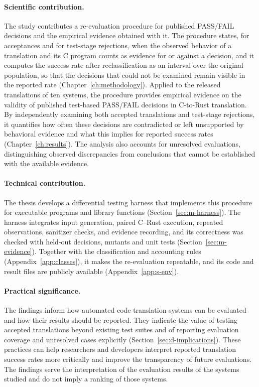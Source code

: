 \paragraph{Scientific contribution.} The study contributes a re-evaluation procedure for published PASS/FAIL decisions and the empirical evidence obtained with it. The procedure states, for acceptances and for test-stage rejections, when the observed behavior of a translation and its C program counts as evidence for or against a decision, and it computes the success rate after reclassification as an interval over the original population, so that the decisions that could not be examined remain visible in the reported rate (Chapter~\ref{ch:methodology}). Applied to the released translations of ten systems, the procedure provides empirical evidence on the validity of published test-based PASS/FAIL decisions in C-to-Rust translation. By independently examining both accepted translations and test-stage rejections, it quantifies how often these decisions are contradicted or left unsupported by behavioral evidence and what this implies for reported success rates (Chapter~\ref{ch:results}). The analysis also accounts for unresolved evaluations, distinguishing observed discrepancies from conclusions that cannot be established with the available evidence.

\paragraph{Technical contribution.} The thesis develops a differential testing harness that implements this procedure for executable programs and library functions (Section~\ref{sec:m-harness}). The harness integrates input generation, paired C--Rust execution, repeated observations, sanitizer checks, and evidence recording, and its correctness was checked with held-out decisions, mutants and unit tests (Section~\ref{sec:m-evidence}). Together with the classification and accounting rules (Appendix~\ref{app:classes}), it makes the re-evaluation repeatable, and its code and result files are publicly available (Appendix~\ref{app:s-env}).

\paragraph{Practical significance.} The findings inform how automated code translation systems can be evaluated and how their results should be reported. They indicate the value of testing accepted translations beyond existing test suites and of reporting evaluation coverage and unresolved cases explicitly (Section~\ref{sec:d-implications}). These practices can help researchers and developers interpret reported translation success rates more critically and improve the transparency of future evaluations. The findings serve the interpretation of the evaluation results of the systems studied and do not imply a ranking of those systems.

